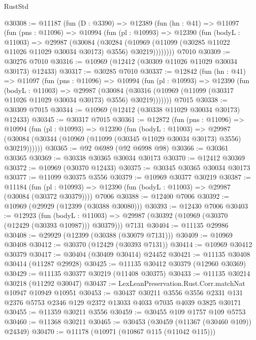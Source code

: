 \begin{lexlean}{RustStd}
\begin{coremodule}
@30308 := @11187
    (fun (D : @3390) =>
    @12389
      (fun (hn : @41) =>
      @11097
        (fun (pns : @11096) =>
        @10994
          (fun (pl : @10993) =>
          @12390
            (fun (bodyL : @11003) =>
            @29987
              (@30084
                (@30284
                  (@10969 (@11099 (@30285 @11022 @11026 @11029 @30034 @30173) @3556) @30219))))))))
    @7010
@30309 := @30276 @7010
@30316 := @10969 (@12412 (@30309 @11026 @11029 @30034 @30173) @12433)
@30317 := @30285 @7010
@30337 := @12842
    (fun (hn : @41) =>
    @11097
      (fun (pns : @11096) =>
      @10994
        (fun (pl : @10993) =>
        @12390
          (fun (bodyL : @11003) =>
          @29987
            (@30084
              (@30316 (@10969 (@11099 (@30317 @11026 @11029 @30034 @30173) @3556) @30219)))))))
    @7015
@30338 := @30309 @7015
@30344 := @10969 (@12412 (@30338 @11029 @30034 @30173) @12433)
@30345 := @30317 @7015
@30361 := @12872
    (fun (pns : @11096) =>
    @10994
      (fun (pl : @10993) =>
      @12390
        (fun (bodyL : @11003) =>
        @29987 (@30084 (@30344 (@10969 (@11099 (@30345 @11029 @30034 @30173) @3556) @30219))))))
@30365 := @92 @6989 (@92 @6998 @98)
@30366 := @30361 @30365
@30369 := @30338 @30365 @30034 @30173
@30370 := @12412 @30369
@30372 := @10969 (@30370 @12433)
@30375 := @30345 @30365 @30034 @30173
@30377 := @11099 @30375 @3556
@30379 := @10969 @30377 @30219
@30387 := @11184
    (fun (pl : @10993) => @12390 (fun (bodyL : @11003) => @29987 (@30084 (@30372 @30379))))
    @7006
@30388 := @12400 @7006
@30392 := @10969 (@29929 (@12399 (@30388 @30080)))
@30393 := @12430 @7006
@30403 := @12923
    (fun (bodyL : @11003) => @29987 (@30392 (@10969 (@30370 (@12429 (@30393 @10987))) @30379)))
    @7131
@30404 := @11135 @29986
@30408 := @29929 (@12399 (@30388 (@30079 @7131)))
@30409 := @10969 @30408
@30412 := @30370 (@12429 (@30393 @7131))
@30414 := @10969 @30412 @30379
@30417 := @30404 (@30409 @30414) @24452
@30421 := @11135 @30408 @30414 (@11287 @29928)
@30425 := @11135 @30412 @30379 (@12960 @30369)
@30429 := @11135 @30377 @30219 (@11408 @30375)
@30433 := @11135 @30214 @30218 (@11292 @30047)
@30437 := LexLeanPreservation.Rust.Corr.matchNat @10947 @10949 @10951
@30453 := @30437
    @30211
    @3556
    @3556
    @2331
    @131
    @2376
    @5753
    @2346
    @129
    @2372
    @13033
    @4033
    @7035
    @4039
    @3825
    @30171
@30455 := @11359 @30211 @3556
@30459 := @30455 @109 @1757 @109 @5753
@30460 := @11368 @30211
@30465 := @30453 (@30459 (@11367 (@30460 @109)) @24349)
@30470 := @11178 (@10971 (@10867 @115 (@11042 @115)))

\end{coremodule}
\end{lexlean}
